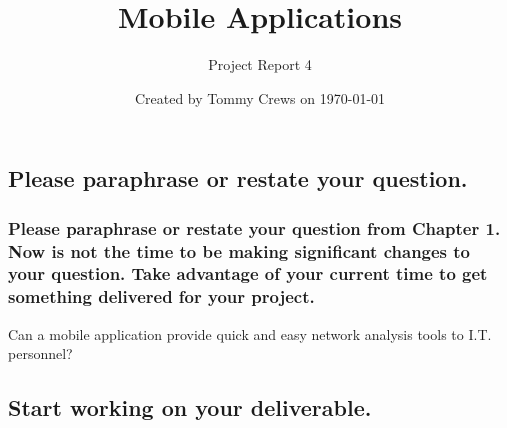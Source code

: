 \documentclass[letterpaper]{article}            %
\title{Mobile Applications}                     %
\author{Project Report 4}                       %
\date{Created by Tommy Crews on \today}         %
\begin{document}
\newcommand{\code}[1]{\texttt{#1}}              %

\setcounter{section}{4}							%

\maketitle                                      %



%
%




\subsection{Please paraphrase or restate your question.}

\subsubsection{Please paraphrase or restate your question from Chapter 1. Now is not the time to be making significant changes to your question. Take advantage of your current time to get something delivered for your project.}

Can a mobile application provide quick and easy network analysis tools to I.T. personnel?


\subsection{Start working on your deliverable.}
\end{document}
